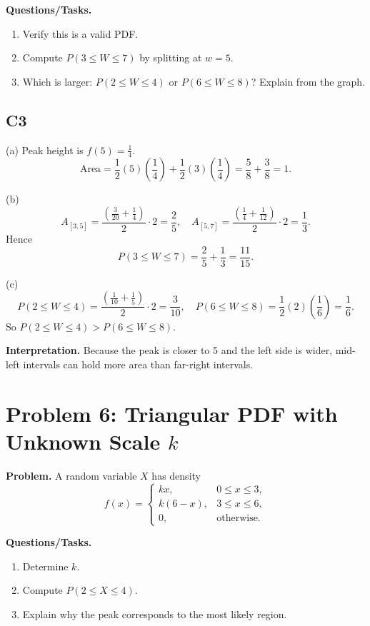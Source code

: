 \textbf{Questions/Tasks.}
\begin{enumerate}
\item Verify this is a valid PDF.
\item Compute $P(3\le W\le 7)$ by splitting at $w=5$.
\item Which is larger: $P(2\le W\le 4)$ or $P(6\le W\le 8)$? Explain from the graph.
\end{enumerate}

\subsection*{C3}
(a) Peak height is $f(5)=\frac14$.
\[
\text{Area}=\frac12(5)\left(\frac14\right)+\frac12(3)\left(\frac14\right)=\frac58+\frac38=1.
\]

(b)
\[
A_{[3,5]}=\frac{\left(\frac3{20}+\frac14\right)}{2}\cdot2=\frac25,
\quad
A_{[5,7]}=\frac{\left(\frac14+\frac1{12}\right)}{2}\cdot2=\frac13.
\]
Hence
\[
P(3\le W\le 7)=\frac25+\frac13=\frac{11}{15}.
\]

(c)
\[
P(2\le W\le 4)=\frac{\left(\frac1{10}+\frac15\right)}{2}\cdot2=\frac3{10},
\quad
P(6\le W\le 8)=\frac12(2)\left(\frac16\right)=\frac16.
\]
So $P(2\le W\le 4)>P(6\le W\le 8)$.

\textbf{Interpretation.}
Because the peak is closer to 5 and the left side is wider, mid-left intervals can hold more area than far-right intervals.

\section{Problem 6: Triangular PDF with Unknown Scale $k$}

\textbf{Problem.}
A random variable $X$ has density
\[
f(x)=\begin{cases}
kx, & 0\le x\le 3,\\
k(6-x), & 3\le x\le 6,\\
0, & \text{otherwise.}
\end{cases}
\]

\textbf{Questions/Tasks.}
\begin{enumerate}
\item Determine $k$.
\item Compute $P(2\le X\le 4)$.
\item Explain why the peak corresponds to the most likely region.
\end{enumerate}

